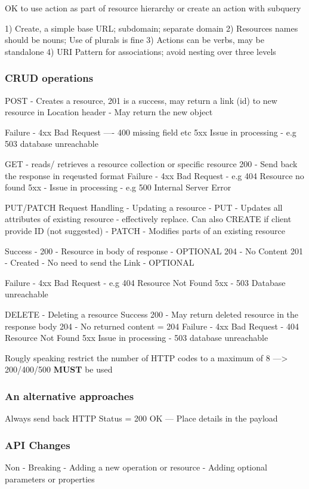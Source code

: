 \documentclass[a4paper, 11pt]{book}
\begin{document}
    OK to use action as part of resource hierarchy or create an action with subquery

    1) Create, a simple base URL; subdomain; separate domain
    2) Resources names should be nouns; Use of plurals is fine
    3) Actions can be verbs, may be standalone
    4) URI Pattern for associations; avoid nesting over three levels

    \subsubsection{CRUD operations}
    POST - Creates a resource,
    201 is a success, may return a link (id) to new resource in Location header
    - May return the new object

    Failure - 4xx Bad Request ---- 400 missing field etc
    5xx Issue in processing - e.g 503 database unreachable

    GET - reads/ retrieves a resource collection or specific resource
    200 - Send back the response in reqeusted format
    Failure - 4xx Bad Request - e.g 404 Resource no found
    5xx - Issue in processing - e.g 500 Internal Server Error

    PUT/PATCH Request Handling - Updating a resource
    - PUT - Updates all attributes of existing resource - effectively replace. Can also CREATE if client provide ID (not suggested)
    - PATCH - Modifies parts of an existing resource

    Success - 200 - Resource in body of response - OPTIONAL
    204 - No Content
    201 - Created - No need to send the Link - OPTIONAL

    Failure - 4xx Bad Request - e.g 404 Resource Not Found
    5xx - 503 Database unreachable

    DELETE - Deleting a resource
    Success 200 - May return deleted resource in the response body
    204 - No returned content = 204
    Failure - 4xx Bad Request - 404 Resource Not Found
    5xx Issue in processing - 503 database unreachable

    Rougly speaking restrict the number of HTTP codes to a maximum of 8
    ---> 200/400/500 \textbf{MUST} be used

    \subsubsection{An alternative approaches}
    Always send back HTTP Status = 200 OK
    --- Place details in the payload

    \subsubsection{API Changes}
    Non - Breaking
    - Adding a new operation or resource
    - Adding optional parameters or properties
\end{document}
